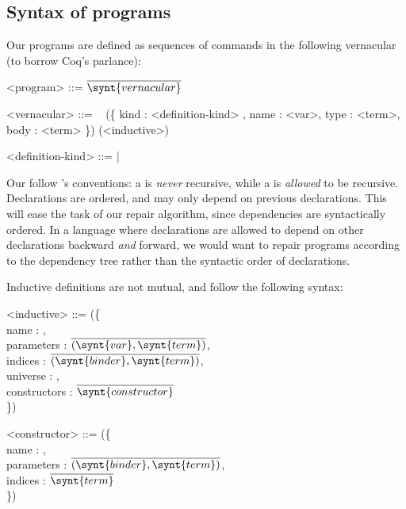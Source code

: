 \subsection{Syntax of \Chick{} programs}\label{chick-syntax-programs}

Our programs are defined as sequences of commands in the following vernacular
(to borrow Coq's parlance):

\begin{grammar}
<program> ::= $\overline{ \synt{vernacular} }$

<vernacular> ::= \ %
\alt {}(\{ kind : <definition-kind> , name : <var>, type : <term>, body : <term> \})
\alt {}(<inductive>)

<definition-kind> ::=  | 
\end{grammar}

Our  follow \Coq{}'s \Vernacular{} conventions: a
 is \emph{never} recursive, while a 
is \emph{allowed} to be recursive.  Declarations are ordered, and may only
depend on previous declarations.  This will ease the task of our repair
algorithm, since dependencies are syntactically ordered.  In a language where
declarations are allowed to depend on other declarations backward \emph{and}
forward, we would want to repair programs according to the dependency tree
rather than the syntactic order of declarations.

Inductive definitions are not mutual, and follow the following syntax:

\noindent
\begin{grammar}
<inductive> ::= (\{\\
name : ,\\
parameters : $\overline{ ( \synt{var} , \synt{term} ) }$,\\
indices : $\overline{ ( \synt{binder} , \synt{term} ) }$,\\
universe : ,\\
constructors : $\overline{ \synt{constructor} }$\\
\})

<constructor> ::= (\{\\
name : ,\\
parameters : $\overline{ ( \synt{binder}, \synt{term} ) }$,\\
indices : $\overline{ \synt{term} }$\\
\})
\end{grammar}
